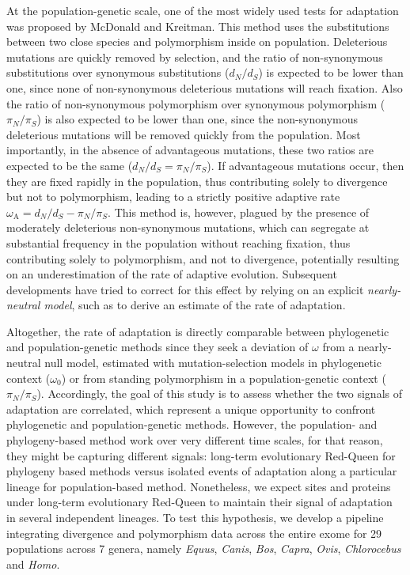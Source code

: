 \documentclass{article}
\newcommand{\dn}{d_N}
\newcommand{\ds}{d_S}
\newcommand{\dnds}{\dn / \ds}
\newcommand{\pn}{\pi_N}
\newcommand{\ps}{\pi_S}
\newcommand{\pnps}{\pn / \ps}
\begin{document}
At the population-genetic scale, one of the most widely used tests for adaptation was proposed by McDonald and Kreitman\cite{mcdonald_adaptative_1991}.
This method uses the substitutions between two close species and polymorphism inside on population.
Deleterious mutations are quickly removed by selection, and the ratio of non-synonymous substitutions over synonymous substitutions ($\dnds$) is expected to be lower than one, since none of non-synonymous deleterious mutations will reach fixation.
Also the ratio of non-synonymous polymorphism over synonymous polymorphism ($\pnps$) is also expected to be lower than one, since the non-synonymous deleterious mutations will be removed quickly from the population.
Most importantly, in the absence of advantageous mutations, these two ratios are expected to be the same ($\dnds=\pnps$).
If advantageous mutations occur, then they are fixed rapidly in the population, thus contributing solely to divergence but not to polymorphism, leading to a strictly positive adaptive rate $\omega_{\mathrm{A}} = \dnds-\pnps$\cite{smith_adaptive_2002}.
This method is, however, plagued by the presence of moderately deleterious non-synonymous mutations, which can segregate at substantial frequency in the population without reaching fixation, thus contributing solely to polymorphism, and not to divergence, potentially resulting on an underestimation of the rate of adaptive evolution\cite{eyre-walker_quantifying_2002}.
Subsequent developments have tried to correct for this effect by relying on an explicit \textit{nearly-neutral model}, such as to derive an estimate of the rate of adaptation\cite{eyre-walker_estimating_2009, galtier_adaptive_2016}.

Altogether, the rate of adaptation is directly comparable between phylogenetic and population-genetic methods since they seek a deviation of $\omega$ from a nearly-neutral null model, estimated with mutation-selection models in phylogenetic context ($\omega_{0}$) or from standing polymorphism in a population-genetic context ($\pnps$).
Accordingly, the goal of this study is to assess whether the two signals of adaptation are correlated, which represent a unique opportunity to confront phylogenetic and population-genetic methods.
However, the population- and phylogeny-based method work over very different time scales, for that reason, they might be capturing different signals: long-term evolutionary Red-Queen for phylogeny based methods versus isolated events of adaptation along a particular lineage for population-based method.
Nonetheless, we expect sites and proteins under long-term evolutionary Red-Queen to maintain their signal of adaptation in several independent lineages.
To test this hypothesis, we develop a pipeline integrating divergence and polymorphism data across the entire exome for 29 populations across 7 genera, namely \textit{Equus}, \textit{Canis}, \textit{Bos}, \textit{Capra}, \textit{Ovis}, \textit{Chlorocebus} and \textit{Homo}.
\end{document}
